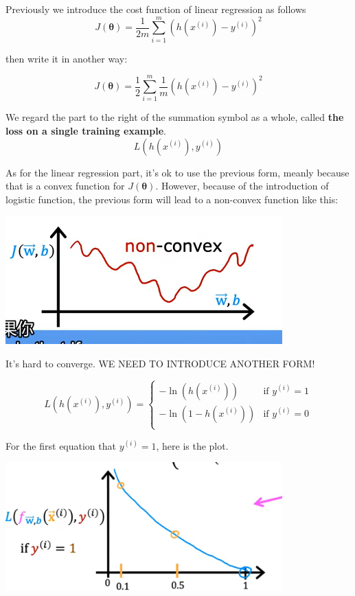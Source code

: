 \documentclass[fontset=windows,pass]{article}
\numberwithin{equation}{subsection} %
\begin{document}
Previously we introduce the cost function of linear regression as follows
\begin{equation*}
	J(\boldsymbol{\theta}) = \frac{1}{2m} \sum_{i=1}^{m} \left(h(x^{(i)})-y^{(i)}\right)^2
\end{equation*}

then write it in another way:

\begin{equation}
	J(\boldsymbol{\theta}) = \frac{1}{2} \sum_{i=1}^{m} \frac{1}{m} \left(h(x^{(i)})-y^{(i)}\right)^2
\end{equation}

We regard the part to the right of the summation symbol as a whole, called \textbf{the loss on a single training example}.
\begin{equation*}
	L\left(h(x^{(i)}), y^{(i)}\right)
\end{equation*}

As for the linear regression part, it's ok to use the previous form, meanly because that is a convex function for $J(\boldsymbol{\theta})$.
However, because of the introduction of logistic function, the previous form will lead to a non-convex function like this:

\begin{center}
	\includegraphics[width = 0.8\textwidth]{Figures/nonconvex.png}
\end{center}

It's hard to converge.
WE NEED TO INTRODUCE ANOTHER FORM!

\begin{equation}
	L\left(h(x^{(i)}), y^{(i)}\right) = 
	\begin{cases}
		-\ln(h(x^{(i)})) & \text{if } y^{(i)} = 1\\
		-\ln(1 - h(x^{(i)})) & \text{if } y^{(i)} = 0\\
	\end{cases}
\end{equation}

For the first equation that $y^{(i)} = 1$, here is the plot.
\begin{center}
	\includegraphics[width = 0.8\textwidth]{Figures/FirstPlot.png}
\end{center}
\end{document}
